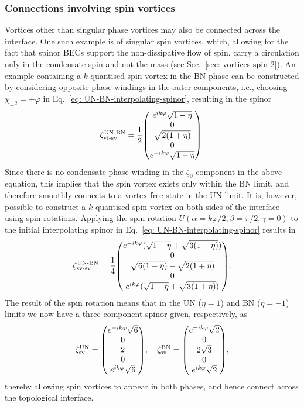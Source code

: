 \subsubsection{Connections involving spin vortices}
Vortices other than singular phase vortices may also be connected across the
interface.
One such example is of singular spin vortices, which, allowing for the fact that
spinor BECs support the non-dissipative flow of spin, carry a circulation only
in the condensate spin and not the mass (see Sec.~\ref{sec: vortices-spin-2}).
An example containing a \(k\)-quantised spin vortex in the BN phase can be
constructed by considering opposite phase windings in the outer components,
i.e., choosing \(\chi_{\pm 2} = \pm \varphi \) in
Eq.~\eqref{eq: UN-BN-interpolating-spinor}, resulting in the spinor
\begin{align}\label{eq: UN-BN-vf-sv}
    \zeta_\text{vf-sv}^\text{UN-BN} = \frac{1}{2}\mqty(
        e^{ik\varphi}\sqrt{1 - \eta} \\
        0 \\
        \sqrt{2(1+\eta)} \\
        0 \\
        e^{-ik\varphi}\sqrt{1 - \eta}
    ).
\end{align}
Since there is no condensate phase winding in the \(\zeta_0\) component in the
above equation, this implies that the spin vortex exists only within the BN
limit, and therefore smoothly connects to a vortex-free state in the UN limit.
It is, however, possible to construct a \(k\)-quantised spin vortex on both
sides of the interface using spin rotations.
Applying the spin rotation \(U(\alpha=k\varphi/2, \beta=\pi/2,\gamma=0)\) to the
initial interpolating spinor in Eq.~\eqref{eq: UN-BN-interpolating-spinor}
results in
\begin{align}\label{eq: UN-BN-sv-sv}
    \zeta_\text{sv-sv}^\text{UN-BN} = \frac{1}{4}\mqty(
        e^{-ik\varphi}(\sqrt{1 - \eta} + \sqrt{3(1+\eta)}) \\
        0 \\
        \sqrt{6(1-\eta)} - \sqrt{2(1+\eta)} \\
        0 \\
        e^{ik\varphi}(\sqrt{1 - \eta} + \sqrt{3(1+\eta)})
    ).
\end{align}
The result of the spin rotation means that in the UN (\(\eta = 1\)) and
BN (\(\eta = -1\)) limits we now have a three-component spinor given,
respectively, as
\begin{align}
    \zeta^\text{UN}_\text{sv} = \mqty(
        e^{-ik\varphi}\sqrt{6} \\ 0 \\ 2 \\ 0 \\ e^{ik\varphi}\sqrt{6}
        ),
    \quad
    \zeta^\text{BN}_\text{sv} = \mqty(
        e^{-ik\varphi}\sqrt{2} \\ 0 \\ 2\sqrt{3} \\ 0 \\ e^{ik\varphi}\sqrt{2}
    ),
\end{align}
thereby allowing spin vortices to appear in both phases, and hence connect
across the topological interface.

